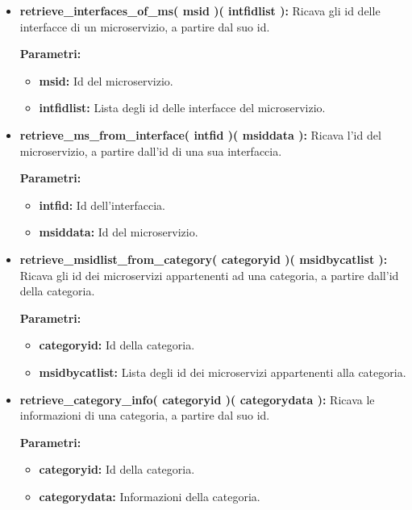 \begin{itemize}
\begin{itemize}
			\item \textbf{retrieve\_interfaces\_of\_ms( msid )( intfidlist ):} Ricava gli id delle interfacce di un microservizio, a partire dal suo id.
				\begin{description}
    				\item[\textbf{Parametri:}]
				\end{description}
				\begin{itemize}
					\item \textbf{msid:} Id del microservizio.
					\item \textbf{intfidlist:} Lista degli id delle interfacce del microservizio.
				\end{itemize}
				
			\item \textbf{retrieve\_ms\_from\_interface( intfid )( msiddata ):} Ricava l'id del microservizio, a partire dall'id di una sua interfaccia.
				\begin{description}
    				\item[\textbf{Parametri:}]
				\end{description}
				\begin{itemize}
					\item \textbf{intfid:} Id dell'interfaccia.
					\item \textbf{msiddata:} Id del microservizio.
				\end{itemize}
				
			\item \textbf{retrieve\_msidlist\_from\_category( categoryid )( msidbycatlist ):} Ricava gli id dei microservizi appartenenti ad una categoria, a partire dall'id della categoria.
				\begin{description}
    				\item[\textbf{Parametri:}]
				\end{description}
				\begin{itemize}
					\item \textbf{categoryid:} Id della categoria.
					\item \textbf{msidbycatlist:} Lista degli id dei microservizi appartenenti alla categoria.
				\end{itemize}
				
			\item \textbf{retrieve\_category\_info( categoryid )( categorydata ):} Ricava le informazioni di una categoria, a partire dal suo id.
				\begin{description}
    				\item[\textbf{Parametri:}]
				\end{description}
				\begin{itemize}
					\item \textbf{categoryid:} Id della categoria.
					\item \textbf{categorydata:} Informazioni della categoria.
				\end{itemize}
				

\end{itemize}
\end{itemize}
